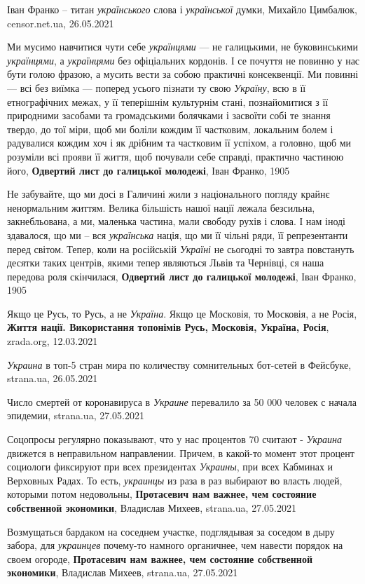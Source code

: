Іван Франко – титан \emph{українського} слова і \emph{української} думки,
Михайло Цимбалюк, censor.net.ua, 26.05.2021

Ми мусимо навчитися чути себе \emph{українцями} — не галицькими, не
буковинськими \emph{українцями}, а \emph{українцями} без офіціальних кордонів.
І се почуття не повинно у нас бути голою фразою, а мусить вести за собою
практичні консеквенції. Ми повинні — всі без виїмка — поперед усього пізнати ту
свою \emph{Україну}, всю в її етнографічних межах, у її теперішнім культурнім
стані, познайомитися з її природними засобами та громадськими болячками і
засвоїти собі те знання твердо, до тої міри, щоб ми боліли кождим її частковим,
локальним болем і радувалися кождим хоч і як дрібним та частковим її успіхом, а
головно, щоб ми розуміли всі прояви її життя, щоб почували себе справді,
практично частиною його, \textbf{Одвертий лист до галицької молодежі}, Іван
Франко, 1905

Не забувайте, що ми досі в Галичині жили з національного погляду крайнє
ненормальним життям. Велика більшість нашої нації лежала безсильна,
закнебльована, а ми, маленька частина, мали свободу рухів і слова. І нам іноді
здавалося, що ми – вся \emph{українська} нація, що ми її чільні ряди, її
репрезентанти перед світом. Тепер, коли на російській \emph{Україні} не
сьогодні то завтра повстануть десятки таких центрів, якими тепер являються
Львів та Чернівці, ся наша передова роля скінчилася, \textbf{Одвертий лист до
галицької молодежі}, Іван Франко, 1905

Якщо це Русь, то Русь, а не \emph{Україна}. Якщо це Московія, то Московія, а не
Росія, \textbf{Життя нації. Використання топонімів Русь, Московія, Україна,
Росія}, zrada.org, 12.03.2021

\emph{Украина} в топ-5 стран мира по количеству сомнительных бот-сетей в Фейсбуке, 
strana.ua, 26.05.2021

Число смертей от коронавируса в \emph{Украине} перевалило за 50 000 человек с начала
эпидемии, strana.ua, 27.05.2021

Соцопросы регулярно показывают, что у нас процентов 70 считают - \emph{Украина}
движется в неправильном направлении. Причем, в какой-то момент этот процент
социологи фиксируют при всех президентах \emph{Украины}, при всех Кабминах и Верховных
Радах. То есть, \emph{украинцы} из раза в раз выбирают во власть людей, которыми потом
недовольны, \textbf{Протасевич нам важнее, чем состояние собственной экономики}, Владислав Михеев, 
strana.ua, 27.05.2021

Возмущаться бардаком на соседнем участке, подглядывая за соседом в дыру забора,
для \emph{украинцев} почему-то намного органичнее, чем навести порядок на своем
огороде, \textbf{Протасевич нам важнее, чем состояние собственной экономики}, Владислав Михеев, 
strana.ua, 27.05.2021

